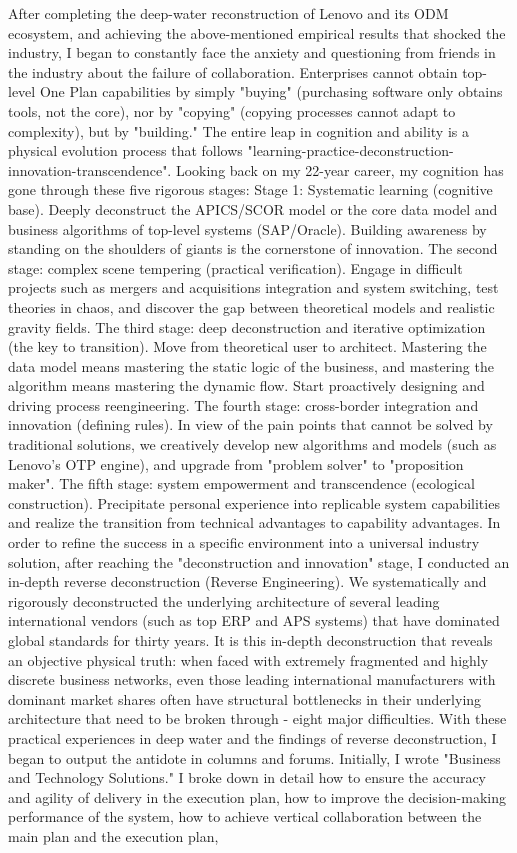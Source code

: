 \documentclass[11pt,a4paper]{article}
\begin{document}
After completing the deep-water reconstruction of Lenovo and its ODM ecosystem, and achieving the above-mentioned empirical results that shocked the industry, I began to constantly face the anxiety and questioning from friends in the industry about the failure of collaboration. Enterprises cannot obtain top-level One Plan capabilities by simply "buying" (purchasing software only obtains tools, not the core), nor by "copying" (copying processes cannot adapt to complexity), but by "building." The entire leap in cognition and ability is a physical evolution process that follows "learning-practice-deconstruction-innovation-transcendence". Looking back on my 22-year career, my cognition has gone through these five rigorous stages: Stage 1: Systematic learning (cognitive base). Deeply deconstruct the APICS/SCOR model or the core data model and business algorithms of top-level systems (SAP/Oracle). Building awareness by standing on the shoulders of giants is the cornerstone of innovation. The second stage: complex scene tempering (practical verification). Engage in difficult projects such as mergers and acquisitions integration and system switching, test theories in chaos, and discover the gap between theoretical models and realistic gravity fields. The third stage: deep deconstruction and iterative optimization (the key to transition). Move from theoretical user to architect. Mastering the data model means mastering the static logic of the business, and mastering the algorithm means mastering the dynamic flow. Start proactively designing and driving process reengineering. The fourth stage: cross-border integration and innovation (defining rules). In view of the pain points that cannot be solved by traditional solutions, we creatively develop new algorithms and models (such as Lenovo's OTP engine), and upgrade from "problem solver" to "proposition maker". The fifth stage: system empowerment and transcendence (ecological construction). Precipitate personal experience into replicable system capabilities and realize the transition from technical advantages to capability advantages. In order to refine the success in a specific environment into a universal industry solution, after reaching the "deconstruction and innovation" stage, I conducted an in-depth reverse deconstruction (Reverse Engineering). We systematically and rigorously deconstructed the underlying architecture of several leading international vendors (such as top ERP and APS systems) that have dominated global standards for thirty years. It is this in-depth deconstruction that reveals an objective physical truth: when faced with extremely fragmented and highly discrete business networks, even those leading international manufacturers with dominant market shares often have structural bottlenecks in their underlying architecture that need to be broken through - eight major difficulties. With these practical experiences in deep water and the findings of reverse deconstruction, I began to output the antidote in columns and forums. Initially, I wrote "Business and Technology Solutions." I broke down in detail how to ensure the accuracy and agility of delivery in the execution plan, how to improve the decision-making performance of the system, how to achieve vertical collaboration between the main plan and the execution plan, 
\end{document}
